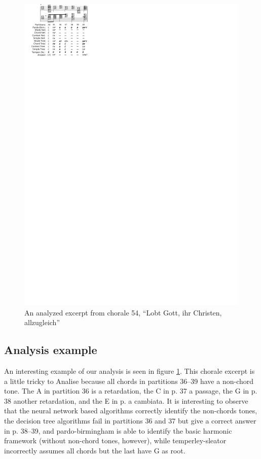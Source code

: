 \documentclass{article}
\begin{document}
\begin{figure}
  \centering
  \includegraphics[scale=4]{coral-054}
  \caption{An analyzed excerpt from chorale 54, ``Lobt Gott, ihr
    Christen, allzugleich''}
  \label{fig:coral-54}
\end{figure}

\subsection{Analysis example}
\label{sec:analysis-example}

An interesting example of our analysis is seen in figure
\ref{fig:coral-54}. This chorale excerpt is a little tricky to Analise
because all chords in partitions 36--39 have a non-chord tone. The A
in partition 36 is a retardation, the C in p. 37 a passage, the G in
p. 38 another retardation, and the E in p. a cambiata. It is
interesting to observe that the neural network based algorithms
correctly identify the non-chords tones, the decision tree algorithms
fail in partitions 36 and 37 but give a correct answer in p. 38--39,
and pardo-birmingham is able to identify the basic harmonic framework
(without non-chord tones, however), while temperley-sleator
incorrectly assumes all chords but the last have G as root.
\end{document}
